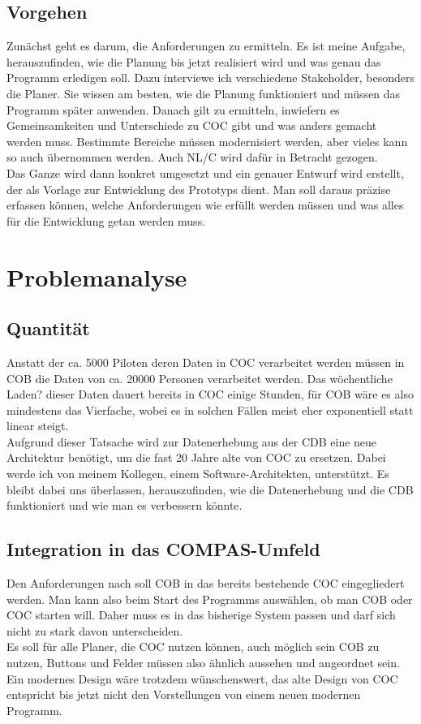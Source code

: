 \documentclass [12pt, a4paper, oneside, titlepage, ngerman]{article}
\begin{document}
\subsection {Vorgehen}
Zunächst geht es darum, die Anforderungen zu ermitteln. Es ist meine Aufgabe, herauszufinden, wie die Planung bis jetzt realisiert wird und was genau das Programm erledigen soll. Dazu interviewe ich verschiedene Stakeholder, besonders die Planer. Sie wissen am besten, wie die Planung funktioniert und müssen das Programm später anwenden. Danach gilt zu ermitteln, inwiefern es Gemeinsamkeiten und Unterschiede zu COC gibt und was anders gemacht werden muss. Bestimmte Bereiche müssen modernisiert werden, aber vieles kann so auch übernommen werden. Auch NL/C wird dafür in Betracht gezogen. \\
Das Ganze wird dann konkret umgesetzt und ein genauer Entwurf wird erstellt, der als Vorlage zur Entwicklung des Prototyps dient. Man soll daraus präzise erfassen können, welche Anforderungen wie erfüllt werden müssen und was alles für die Entwicklung getan werden muss.
\newpage

\section{Problemanalyse}
\subsection{Quantität}
Anstatt der ca. 5000 Piloten deren Daten in COC verarbeitet werden müssen in COB die Daten von ca. 20000 Personen verarbeitet werden. Das wöchentliche Laden? dieser Daten dauert bereits in COC einige Stunden, für COB wäre es also mindestens das Vierfache, wobei es in solchen Fällen meist eher exponentiell statt linear steigt. \\
Aufgrund dieser Tatsache wird zur Datenerhebung aus der CDB eine neue Architektur benötigt, um die fast 20 Jahre alte von COC zu ersetzen. Dabei werde ich von meinem Kollegen, einem Software-Architekten, unterstützt. Es bleibt dabei uns überlassen, herauszufinden, wie die Datenerhebung und die CDB funktioniert und wie man es verbessern könnte.

\subsection{Integration in das COMPAS-Umfeld}
Den Anforderungen nach soll COB in das bereits bestehende COC eingegliedert werden. Man kann also beim Start des Programms auswählen, ob man COB oder COC starten will. Daher muss es in das bisherige System passen und darf sich nicht zu stark davon unterscheiden. \\
Es soll für alle Planer, die COC nutzen können, auch möglich sein COB zu nutzen, Buttons und Felder müssen also ähnlich aussehen und angeordnet sein. Ein modernes Design wäre trotzdem wünschenswert, das alte Design von COC entspricht bis jetzt nicht den Vorstellungen von einem neuen modernen Programm.
\end{document}
